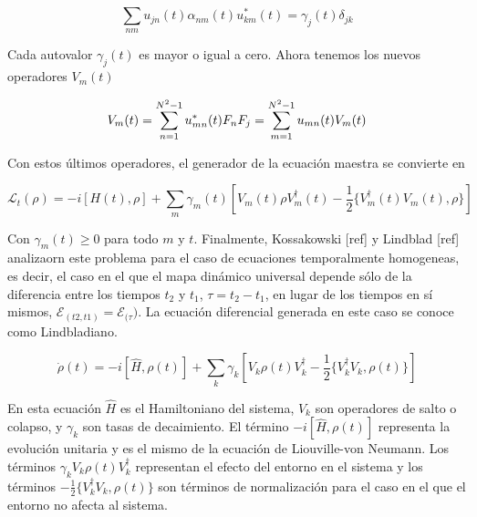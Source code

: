 \begin{equation}
    \sum_{nm} u_{jn}(t) \alpha_{nm}(t) u_{km}^*(t) = \gamma_j(t) \delta_{jk}
\end{equation}

Cada autovalor $\gamma_j(t)$ es mayor o igual a cero. Ahora tenemos los nuevos operadores $V_m(t)$

\begin{equation}
    V_m(t) = \sum_{n=1}^{N^2-1} u_{mn}^*(t) F_n \\
    F_j = \sum_{m=1}^{N^2-1} u_{mn}(t) V_m(t)
\end{equation}

Con estos últimos operadores, el generador de la ecuación maestra se convierte en

\begin{equation}
    \mathcal{L}_t(\rho) = -i [H(t), \rho] + \sum_m \gamma_m(t) \left[ V_m(t) \rho V_m^\dagger(t) - \frac{1}{2} \{V_m^\dagger(t) V_m(t), \rho\}\right]
\end{equation}

Con $\gamma_m(t) \geq 0$ para todo $m$ y $t$. Finalmente, Kossakowski [ref] y Lindblad [ref] analizaorn este problema para el caso de ecuaciones temporalmente homogeneas, es decir, el caso en el que el mapa dinámico universal depende sólo de la diferencia entre los tiempos $t_2$ y $t_1$, $\tau = t_2 - t_1$, en lugar de los tiempos en sí mismos, $\mathcal{E}_{(t2, t1)} = \mathcal{E}_{(\tau})$. La ecuación diferencial generada en este caso se conoce como Lindbladiano.

\begin{equation}
    \dot{\rho}(t) = -i [\hat{H}, \rho(t)] + \sum_k \gamma_k [V_k \rho(t) V_k^\dagger - \frac{1}{2} \{V_k^\dagger V_k, \rho(t)\}]
\end{equation}

En esta ecuación $\hat{H}$ es el Hamiltoniano del sistema, $V_k$ son operadores de salto o colapso, y $\gamma_k$ son tasas de decaimiento. El término $-i [\hat{H}, \rho(t)]$ representa la evolución unitaria y es el mismo de la ecuación de Liouville-von Neumann. Los términos $\gamma_k V_k \rho(t) V_k^\dagger$ representan el efecto del entorno en el sistema y los términos $-\frac{1}{2} \{V_k^\dagger V_k, \rho(t)\}$ son términos de normalización para el caso en el que el entorno no afecta al sistema.



